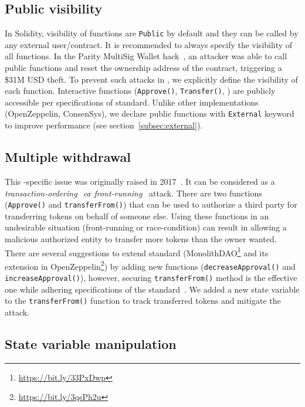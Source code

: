 \subsection{Public visibility}

In Solidity, visibility of functions are \texttt{Public} by default and they can be called by any external user/contract. It is recommended to always specify the visibility of all functions. In the Parity MultiSig Wallet hack~\cite{ParityFirstHack}, an attacker was able to call public functions and reset the ownership address of the contract, triggering a \$31M USD theft. To prevent such attacks in \sys, we explicitly define the visibility of each function. Interactive functions (\eg \texttt{Approve()}, \texttt{Transfer()}, \etc) are publicly accessible per specifications of \erc standard. { \blue Unlike other implementations (\eg OpenZeppelin, ConsenSys), we declare public functions with \texttt{External} keyword to improve performance (see section~\ref{subsec:external}).}

\subsection{Multiple withdrawal}

This \erc-specific issue was originally raised in 2017~\cite{MikVlad,TomHale}. It can be considered as a \textit{transaction-ordering}~\cite{OrderingAttack} or \textit{front-running}~\cite{eskandari2019sok} attack. There are two \erc functions (\ie \texttt{Approve()} and \texttt{transferFrom()}) that can be used to authorize a third party for transferring tokens on behalf of someone else. Using these functions  in an undesirable situation (\ie front-running or race-condition) can result in allowing a malicious authorized entity to transfer more tokens than the owner wanted. There are several suggestions to extend \erc standard (\eg MonolithDAO\footnote{\url{https://bit.ly/33PxDwp}} and its extension in OpenZeppelin\footnote{\url{https://bit.ly/3qsPh2u}}) by adding new functions (\ie \texttt{decreaseApproval()} and \texttt{increaseApproval()}), however, securing \texttt{transferFrom()} method is the effective one while adhering specifications of the \erc standard~\cite{ERC20MWA}. We added a new state variable to the \texttt{transferFrom()} function to track transferred tokens and mitigate the attack. 

\subsection{State variable manipulation}

